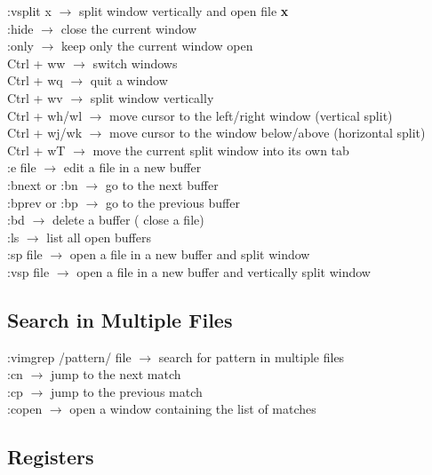 \documentclass[twoside,a4paper]{article}
\newcommand{\tcb}{\color{blue}} \newcommand{\tcc}{\color{cyan}} \newcommand{\tcr}{\color{red}}
\newcommand{\tck}{\color{black}}
\newcommand{\ra }{$\rightarrow$ }
\begin{document}
\begin{multicols}{2}
    \tcr :vsplit x \tck \ra split window vertically and open file \textbf{x}\\
    \tcr :hide \tck \ra close the current window\\
    \tcr :only \tck \ra keep only the current window open\\
    \tcr Ctrl + ww \tck \ra switch windows\\
    \tcr Ctrl + wq \tck \ra quit a window\\
    \tcr Ctrl + wv \tck \ra split window vertically\\
    \tcr Ctrl + wh/wl \tck \ra move cursor to the left/right window (vertical split)\\
    \tcr Ctrl + wj/wk \tck \ra move cursor to the window below/above (horizontal split)\\
    \tcr Ctrl + wT \tck \ra move the current split window into its own tab\\
    \tcr :e \tcb  file \tck \ra edit a file in a new buffer\\
    \tcr :bnext or :bn \tck \ra go to the next buffer\\
    \tcr :bprev or :bp \tck \ra go to the previous buffer\\
    \tcr :bd \tck \ra delete a buffer ( close a file)\\
    \tcr :ls \tck \ra list all open buffers\\
    \tcr :sp \tcb  file \tck \ra open a file in a new buffer and split window\\
    \tcr :vsp \tcb  file \tck $\rightarrow$ open a file in a new buffer and vertically split
    window\\

    \vfill \null

    \vspace{-1 cm}
    \tcc \subsection{Search in Multiple Files}

    \tcr :vimgrep /pattern/ {file} \tck $\rightarrow$ search for pattern in multiple files\\
    \tcr :cn \tck \ra jump to the next match\\
    \tcr :cp \tck \ra jump to the previous match\\
    \tcr :copen \tck \ra open a window containing the list of matches

    \tcc \subsection{Registers}


\end{multicols}
\end{document}
